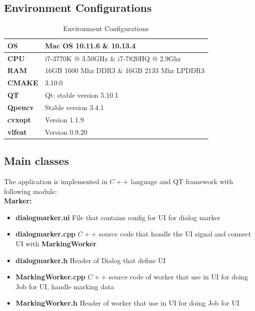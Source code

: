 \subsection{Environment Configurations}
\begin{table}[H]
  \begin{center}
    \begin{tabular}{ | l | l |} 
    \hline
    \textbf{OS} & Mac OS  10.11.6 \& 10.13.4\\
    \hline
    \textbf{CPU} & i7-3770K @ 3.50GHz \& i7-7820HQ @ 2.9Ghz \\
    \hline
    \textbf{RAM} & 16GB 1600 Mhz DDR3 \& 16GB 2133 Mhz LPDDR3 \\
    \hline
    \textbf{CMAKE} & 3.10.0 \\
    \hline
    \textbf{QT} & Qt: stable version 5.10.1 \\
    \hline
    \textbf{Qpencv} & Stable version 3.4.1 \\
    \hline
    \textbf{cvxopt} & Version 1.1.9 \\
    \hline
    \textbf{vlfeat} & Version 0.9.20 \\
    \hline
    \end{tabular}
  \end{center}
  \caption{Environment Configurations}\label{tab:Environmentconfigurations}
\end{table}


\subsection{Main classes}

The application is implemented in $C++$ language and QT framework with following module:\\
\textbf{Marker: }
\begin{itemize}
  \item \textbf{dialogmarker.ui} File that contains config for UI for dialog marker
  \item \textbf{dialogmarker.cpp} $C++$ source code that handle the UI signal and connect UI with \textbf{MarkingWorker}
  \item \textbf{dialogmarker.h} Header of Dialog that define UI
  \item \textbf{MarkingWorker.cpp} $C++$ source code of worker that use in UI for doing Job for UI, handle marking data
  \item \textbf{MarkingWorker.h} Header of worker that use in UI for doing Job for UI
\end{itemize}

